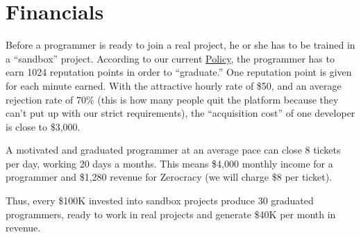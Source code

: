 \documentclass{main}
\begin{document}
\section{Financials}

Before a programmer is ready to join a real project, he or she has to be
trained in a ``sandbox'' project. According to our current \href{http://www.zerocracy.com/policy.html}{Policy},
the programmer has to earn 1024 reputation points in order to ``graduate.''
One reputation point is given for each minute earned. With the attractive
hourly rate of \$50, and an average rejection rate of 70\% (this is how many
people quit the platform because they can't put up with our strict requirements),
the ``acquisition cost'' of one developer is close to \$3,000.

A motivated and graduated programmer at an average pace can close 8 tickets per day,
working 20 days a months. This means \$4,000 monthly income for a programmer
and \$1,280 revenue for Zerocracy (we will charge \$8 per ticket).

Thus, every \$100K invested into sandbox projects produce 30 graduated programmers,
ready to work in real projects and generate \$40K per month in revenue.
\end{document}
